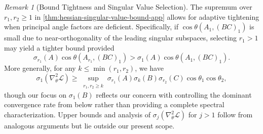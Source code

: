\documentclass{article}
\newcommand{\prinangle}{\cos\theta}
\theoremstyle{plain}
\theoremstyle{definition}
\theoremstyle{remark}
\newtheorem{remark}[theorem]{Remark}
\begin{document}
\begin{remark}[Bound Tightness and Singular Value Selection]
\label{remark:bound-tightness}
The supremum over $r_1, r_2 \geq 1$ in \cref{thm:hessian-singular-value-bound-app} allows for adaptive tightening when principal angle factors are deficient. Specifically, if $\prinangle(A_1, (BC)_1)$ is small due to near-orthogonality of the leading singular subspaces, selecting $r_1 > 1$ may yield a tighter bound provided
\[
\sigma_{r_1}(A)\prinangle(A_{r_1}, (BC)_1) > \sigma_1(A)\prinangle(A_1, (BC)_1).
\]
More generally, for any $k \leq \min(r_1, r_2)$, we have
\[
\sigma_1(\nabla^2_\theta \mathcal{L}) \geq \sup_{\substack{r_1, r_2 \geq k}} \sigma_{r_1}(A)\sigma_k(B)\sigma_{r_2}(C)\prinangle_1\prinangle_2,
\]
though our focus on $\sigma_1(B)$ reflects our concern with controlling the dominant convergence rate from below rather than providing a complete spectral characterization. Upper bounds and analysis of $\sigma_j(\nabla^2_\theta \mathcal{L})$ for $j > 1$ follow from analogous arguments but lie outside our present scope.
\end{remark}
\end{document}
